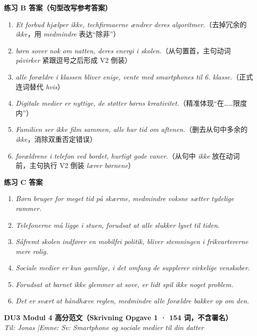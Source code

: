 \begin{answerbox}
\textbf{练习 B 答案（句型改写参考答案）}
\begin{enumerate}
  \item \textit{Et forbud hjælper ikke,  techfirmaerne ændrer deres algoritmer.}（去掉冗余的 \textit{ikke}，用 \textit{medmindre} 表达“除非”）
  \item \textit{ børn sover nok om natten,  deres energi i skolen.}（从句置首，主句动词 \textit{påvirker} 紧跟逗号之后形成 V2 倒装）
  \item \textit{ alle forældre i klassen bliver enige,  vente med smartphones til 6. klasse.}（正式连词替代 \textit{hvis}）
  \item \textit{Digitale medier er nyttige,  de støtter børns kreativitet.}（精准体现“在……限度内”）
  \item \textit{Familien ser ikke film sammen,  alle har tid om aftenen.}（删去从句中多余的 \textit{ikke}，消除双重否定错误）
  \item \textit{ forældrene  i telefon ved bordet,  hurtigt gode vaner.}（从句中 \textit{ikke} 放在动词前，主句执行 V2 倒装 \textit{lærer børnene}）
\end{enumerate}

\textbf{练习 C 答案}
\begin{enumerate}
  \item \textit{Børn bruger for meget tid på skærme, medmindre voksne sætter tydelige rammer.}
  \item \textit{Telefonerne må ligge i stuen, forudsat at alle slukker lyset til tiden.}
  \item \textit{Såfremt skolen indfører en mobilfri politik, bliver stemningen i frikvartererne mere rolig.}
  \item \textit{Sociale medier er kun gavnlige, i det omfang de supplerer virkelige venskaber.}
  \item \textit{Forudsat at barnet ikke glemmer at sove, er lidt spil ikke noget problem.}
  \item \textit{Det er svært at håndhæve reglen, medmindre alle forældre bakker op om den.}
\end{enumerate}

\textbf{DU3 Modul 4 高分范文（Skrivning Opgave 1 · 154 词，不含署名）}\\
\textit{Til: Jonas \quad|\quad Emne: Sv: Smartphone og sociale medier til din datter}


\end{answerbox}
